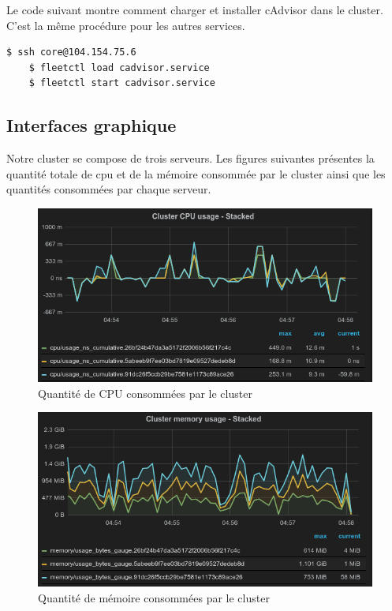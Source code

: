 \begin{onehalfspace}
Le code suivant montre comment charger et installer cAdvisor dans le cluster. C'est la même procédure pour les autres services.

\begin{lstlisting}[language=bash,caption=Lancement du service cAdvisor]
	$ ssh core@104.154.75.6 
	$ fleetctl load cadvisor.service
	$ fleetctl start cadvisor.service
\end{lstlisting}


\subsection{Interfaces graphique}

Notre cluster se compose de trois serveurs. Les figures suivantes présentes la quantité totale de \acrshort{cpu} et de la mémoire consommée par le cluster ainsi que les quantités consommées par chaque serveur.

\begin{figure}[H]
\centering
\includegraphics [scale=0.6]{chapitre5/assets/cluster-cpu}
\caption{Quantité de CPU consommées par le cluster}
\label{fig:}
\end{figure}

\begin{figure}[H]
\centering
\includegraphics [scale=0.6]{chapitre5/assets/cluster-memory}
\caption{Quantité de mémoire consommées par le cluster}
\label{fig:}
\end{figure}



\end{onehalfspace}
